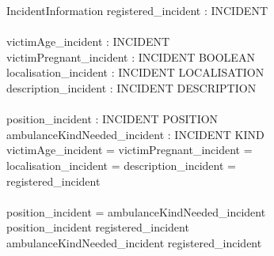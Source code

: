 \documentclass[12pt]{article}
\begin{document}
\begin{schema}{IncidentInformation}
	registered\_incident : \power INCIDENT \\
	\newline \\
	victimAge\_incident : INCIDENT \pfun \nat \\ %
	victimPregnant\_incident : INCIDENT \pfun BOOLEAN \\
	localisation\_incident : INCIDENT \pfun LOCALISATION \\
	description\_incident : INCIDENT \pfun DESCRIPTION \\
	\newline \\
	position\_incident : INCIDENT \pfun POSITION \\
	ambulanceKindNeeded\_incident : INCIDENT \pfun KIND \\
  \where
  	\dom victimAge\_incident = \dom victimPregnant\_incident =\\
	 \dom localisation\_incident = \dom description\_incident =\\
	 registered\_incident \\
	 \newline \\
	 \dom position\_incident = \dom ambulanceKindNeeded\_incident \\
	 \dom position\_incident \subseteq registered\_incident \\
	 \dom ambulanceKindNeeded\_incident  \subseteq registered\_incident \\ %
\end{schema}
\end{document}
